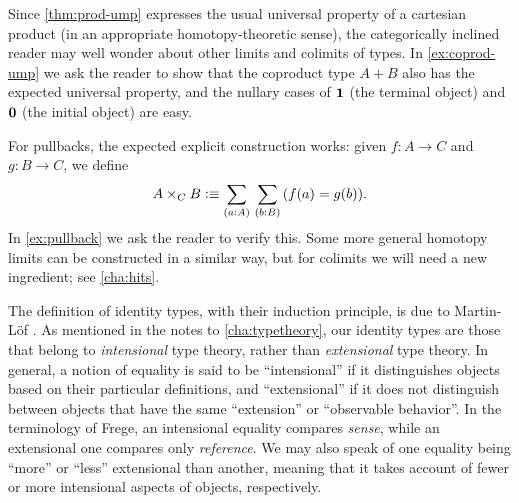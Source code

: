 %
%
%
%
Since \cref{thm:prod-ump} expresses the usual universal property of a cartesian product (in an appropriate homotopy-theoretic sense), the categorically inclined reader may well wonder about other limits and colimits of types.
In \cref{ex:coprod-ump} we ask the reader to show that the coproduct type $A+B$ also has the expected universal property, and the nullary cases of $\mathbf{1}$ (the terminal object) and $\mathbf{0}$ (the initial object) are easy.
%
%
%
%

%
For pullbacks, the expected explicit construction works: given $f:A\to C$ and $g:B\to C$, we define
\begin{equation}
  A\times_C B \defeq \sm{a:A}{b:B} (f(a)=g(b)).\label{eq:defn-pullback}
\end{equation}
In \cref{ex:pullback} we ask the reader to verify this.
Some more general homotopy limits can be constructed in a similar way, but for colimits we will need a new ingredient; see \cref{cha:hits}.

%

\sectionNotes

The definition of identity types, with their induction principle, is due to Martin-L\"of \cite{Martin-Lof-1972}.
%
%
%
%
%
As mentioned in the notes to \cref{cha:typetheory}, our identity types are those that belong to \emph{intensional} type theory, rather than \emph{extensional} type theory.
In general, a notion of equality is said to be ``intensional'' if it distinguishes objects based on their particular definitions, and ``extensional'' if it does not distinguish between objects that have the same ``extension'' or ``observable behavior''.
In the terminology of Frege, an intensional equality compares \emph{sense}, while an extensional one compares only \emph{reference}.
We may also speak of one equality being ``more'' or ``less'' extensional than another, meaning that it takes account of fewer or more intensional aspects of objects, respectively.

